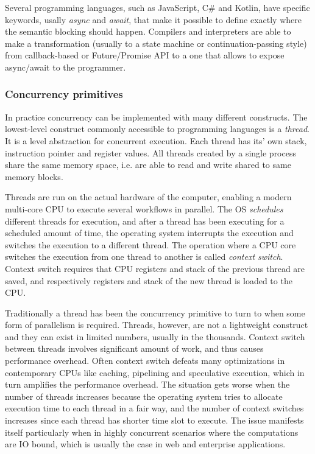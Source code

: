 Several programming languages, such as JavaScript, C\# and Kotlin, have specific keywords, usally \textit{async} and \textit{await}, that make it possible to define exactly where the semantic blocking should happen. Compilers and interpreters are able to make a transformation (usually to a state machine or continuation-passing style) from callback-based or Future/Promise API to a one that allows to expose async/await to the programmer.


\subsubsection{Concurrency primitives}
In practice concurrency can be implemented with many different constructs. The lowest-level construct commonly accessible to programming languages is a \textit{thread}. It is a  level abstraction for concurrent execution. Each thread has its' own stack, instruction pointer and  register values. All threads created by a single process share the same memory space, i.e. are able to read and write shared to same memory blocks.

Threads are run on the actual hardware of the computer, enabling a modern multi-core CPU to execute several workflows in parallel. The OS \textit{schedules} different threads for execution, and after a thread has been executing for a scheduled amount of time, the operating system interrupts the execution and switches the execution to a different thread. The operation where a CPU core switches the execution from one thread to another is called \textit{context switch}. Context switch requires that CPU registers and stack of the previous thread are saved, and respectively registers and stack of the new thread is loaded to the CPU.

Traditionally a thread has been the concurrency primitive to turn to when some form of parallelism is required. Threads, however, are not a lightweight construct and they can exist in limited numbers, usually in the thousands. Context switch between threads involves significant amount of work, and thus causes performance overhead. Often context switch defeats many optimizations in contemporary CPUs like caching, pipelining and speculative execution, which in turn amplifies the performance overhead. The situation gets worse when the number of threads increases because the operating system tries to allocate execution time to each thread in a fair way, and the number of context switches increases since each thread has shorter time slot to execute. The issue manifests itself particularly when in highly concurrent scenarios where the computations are IO bound, which is usually the case in web and enterprise applications.

